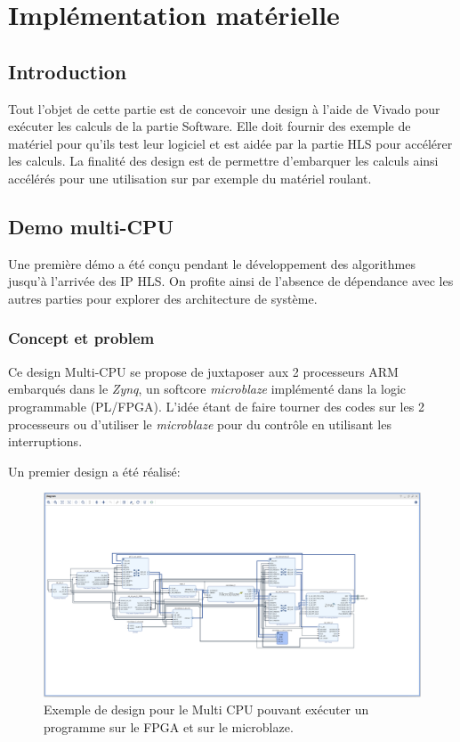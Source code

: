 \documentclass[12pt,a4paper]{article}
\begin{document}
\section{Implémentation matérielle}
\subsection{Introduction}
Tout l'objet de cette partie est de concevoir une design à l'aide de Vivado pour exécuter les calculs de la partie Software. Elle doit fournir des exemple de matériel pour qu'ils test leur logiciel et est aidée par la partie HLS pour accélérer les calculs. La finalité des design est de permettre d'embarquer les calculs ainsi accélérés pour une utilisation sur par exemple du matériel roulant.
\subsection{Demo multi-CPU}
Une première démo a été conçu pendant le développement des algorithmes jusqu'à l'arrivée des IP HLS. On profite ainsi de l'absence de dépendance avec les autres parties pour explorer des architecture de système.
\subsubsection{Concept et problem}
Ce design Multi-CPU se propose de juxtaposer aux 2 processeurs ARM embarqués dans le \textit{Zynq}, un softcore \textit{microblaze} implémenté dans la logic programmable (PL/FPGA). L'idée étant de faire tourner des codes sur les 2 processeurs ou d'utiliser le \textit{microblaze} pour du contrôle en utilisant les interruptions.


Un premier design a été réalisé:
\begin{figure}[H]
	\centering
	\includegraphics[width=\linewidth]{im/mb1.png}	
	\caption{Exemple de design pour le Multi CPU pouvant exécuter un programme sur le FPGA et sur le microblaze. }
	\label{fig-mb}
\end{figure}
\end{document}
